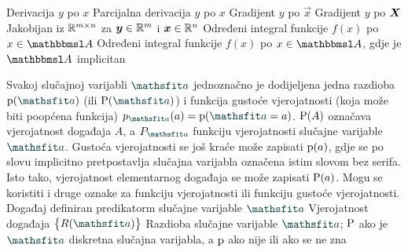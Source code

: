  				{Derivacija $y$ po $x$}
 				{Parcijalna derivacija $y$ po $x$}
 	{Gradijent $y$ po $\vec x$}
	{Gradijent $y$ po $\mat X$}
 	{Jakobijan iz $\R^{m\times n}$ za $\vec y\in\R^m$ i $\vec x\in\R^n$}
 {Određeni integral funkcije $f(x)$ po $x\in\set A$}
 {Određeni integral funkcije $f(x)$ po $x\in\set A$, gdje je $\set A$ implicitan}

{Svakoj slučajnoj varijabli $\rvar a$ jednoznačno je dodijeljena jedna razdioba $\p(\rvar a)$ (ili $\P(\rvar a)$) i funkcija gustoće vjerojatnosti (koja može biti poopćena funkcija) $p_{\rvar a}(a)=\p(\rvar a=a)$. $\P(A)$ označava vjerojatnost događaja $A$, a $P_{\rvar a}$ funkciju vjerojatnosti slučajne varijable $\rvar a$. Gustoća vjerojatnosti se još kraće može zapisati $\p(a)$, gdje se po slovu implicitno pretpostavlja slučajna varijabla označena istim slovom bez serifa. Isto tako, vjerojatnost elementarnog događaja se može zapisati $\P(a)$. Mogu se koristiti i druge oznake za funkciju vjerojatnosti ili funkciju gustoće vjerojatnosti.}
 {Događaj definiran predikatorm slučajne varijable $\rvar a$}
 {Vjerojatnost događaja $\cbr{R(\rvar a)}$}
 {Razdioba slučajne varijable $\rvar a$; $\P$ ako je $\rvar a$ diskretna slučajna varijabla, a $\p$ ako nije ili ako se ne zna}
